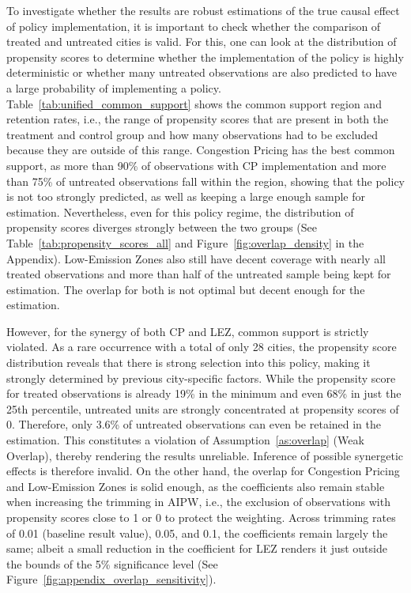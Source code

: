 \documentclass[12pt, a4paper]{article}
\begin{document}
To investigate whether the results are robust estimations of the true causal effect of policy implementation, it is important to check whether the comparison of treated and untreated cities is valid. For this, one can look at the distribution of propensity scores to determine whether the implementation of the policy is highly deterministic or whether many untreated observations are also predicted to have a large probability of implementing a policy. Table~\ref{tab:unified_common_support} shows the common support region and retention rates, i.e., the range of propensity scores that are present in both the treatment and control group and how many observations had to be excluded because they are outside of this range. Congestion Pricing has the best common support, as more than 90\% of observations with CP implementation and more than 75\% of untreated observations fall within the region, showing that the policy is not too strongly predicted, as well as keeping a large enough sample for estimation. Nevertheless, even for this policy regime, the distribution of propensity scores diverges strongly between the two groups (See Table~\ref{tab:propensity_scores_all} and Figure~\ref{fig:overlap_density} in the Appendix). Low-Emission Zones also still have decent coverage with nearly all treated observations and more than half of the untreated sample being kept for estimation. The overlap for both is not optimal but decent enough for the estimation.





 However, for the synergy of both CP and LEZ, common support is strictly violated. As a rare occurrence with a total of only 28 cities, the propensity score distribution reveals that there is strong selection into this policy, making it strongly determined by previous city-specific factors. While the propensity score for treated observations is already 19\% in the minimum and even 68\% in just the 25th percentile, untreated units are strongly concentrated at propensity scores of 0. Therefore, only 3.6\% of untreated observations can even be retained in the estimation. This constitutes a violation of Assumption~\ref{as:overlap} (Weak Overlap), thereby rendering the results unreliable. Inference of possible synergetic effects is therefore invalid. On the other hand, the overlap for Congestion Pricing and Low-Emission Zones is solid enough, as the coefficients also remain stable when increasing the trimming in AIPW, i.e., the exclusion of observations with propensity scores close to 1 or 0 to protect the weighting. Across trimming rates of 0.01 (baseline result value), 0.05, and 0.1, the coefficients remain largely the same; albeit a small reduction in the coefficient for LEZ renders it just outside the bounds of the 5\% significance level (See Figure~\ref{fig:appendix_overlap_sensitivity}).
\end{document}

